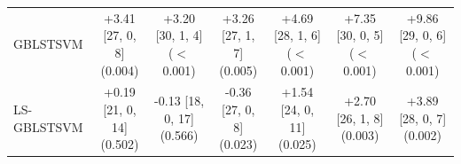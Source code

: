 \begin{table}[!t]
{\begin{tabular}{lcccccc}
GBLSTSVM & \shortstack{+3.41 [27, 0, 8]\\(0.004)} & \shortstack{+3.20 [30, 1, 4]\\($<$0.001)} & \shortstack{+3.26 [27, 1, 7]\\(0.005)} & \shortstack{+4.69 [28, 1, 6]\\($<$0.001)} & \shortstack{+7.35 [30, 0, 5]\\($<$0.001)} & \shortstack{+9.86 [29, 0, 6]\\($<$0.001)} \\[4pt]
LS-GBLSTSVM & \shortstack{+0.19 [21, 0, 14]\\(0.502)} & \shortstack{-0.13 [18, 0, 17]\\(0.566)} & \shortstack{-0.36 [27, 0, 8]\\(0.023)} & \shortstack{+1.54 [24, 0, 11]\\(0.025)} & \shortstack{+2.70 [26, 1, 8]\\(0.003)} & \shortstack{+3.89 [28, 0, 7]\\(0.002)} \\[4pt]
\bottomrule
\end{tabular}}
\end{table}
